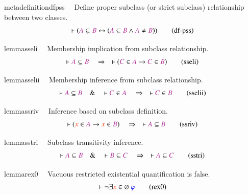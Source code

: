 \begin{restatable}{metadefinition}{dfpss}~~ Define proper subclass (or strict
subclass) relationship between two
     classes.  
\begin{align}
\vdash ( \mc{A} \subsetneq \mc{B} \leftrightarrow ( \mc{A} \subseteq \mc{B}
    \wedge \mc{A} \ne \mc{B} ) )\label{eq:df-pss}\tag{df-pss}
\end{align}
\end{restatable}

\begin{restatable}{lemma}{sseli}~~ Membership implication from subclass
relationship.  ~
\begin{align}
\vdash \mc{A} \subseteq \mc{B}\quad\Rightarrow\quad \vdash ( \mc{C} \in \mc{A}
    \rightarrow \mc{C} \in \mc{B} )\label{eq:sseli}\tag{sseli}
\end{align}
\end{restatable}

\begin{restatable}{lemma}{sselii}~~ Membership inference from subclass
relationship.  ~
\begin{align}
\vdash \mc{A} \subseteq \mc{B}\quad\&\quad \vdash \mc{C} \in
    \mc{A}\quad\Rightarrow\quad \vdash \mc{C} \in
    \mc{B}\label{eq:sselii}\tag{sselii}
\end{align}
\end{restatable}

\begin{restatable}{lemma}{ssriv}~~ Inference based on subclass definition. 
~
\begin{align}
\vdash ( \msc{x} \in \mc{A} \rightarrow \msc{x} \in \mc{B}
    )\quad\Rightarrow\quad \vdash \mc{A} \subseteq
    \mc{B}\label{eq:ssriv}\tag{ssriv}
\end{align}
\end{restatable}

\begin{restatable}{lemma}{sstri}~~ Subclass transitivity inference. 
~
\begin{align}
\vdash \mc{A} \subseteq \mc{B}\quad\&\quad \vdash \mc{B} \subseteq
    \mc{C}\quad\Rightarrow\quad \vdash \mc{A} \subseteq
    \mc{C}\label{eq:sstri}\tag{sstri}
\end{align}
\end{restatable}

\begin{restatable}{lemma}{rex0}~~ Vacuous restricted existential quantification
is false.  ~
\begin{align}
\vdash \lnot \exists \msc{x} \in \varnothing~
    \mw{\varphi}\label{eq:rex0}\tag{rex0}
\end{align}
\end{restatable}


